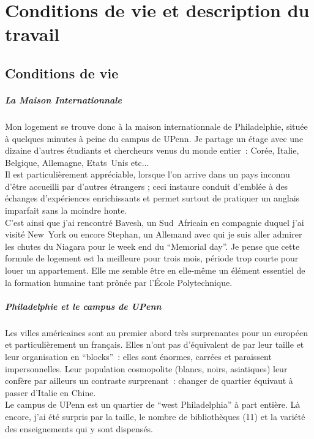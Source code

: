 \documentclass[11pt]{report}
\begin{document}
\chapter{Conditions de vie et description du travail}
\section{Conditions de vie}
\paragraph{La Maison Internationnale\\}
Mon logement se trouve donc \`a la maison internationnale de Philadelphie, 
situ\'ee \`a quelques minutes \`a peine du campus de UPenn. Je partage un 
\'etage avec une dizaine d'autres \'etudiants et chercheurs venus du monde 
entier~: Cor\'ee, Italie, Belgique, Allemagne, Etats~Unis etc...\\
Il est particuli\`erement appr\'eciable, lorsque l'on arrive dans un pays
inconnu d'\^etre accueilli par d'autres \'etrangers ; ceci instaure 
conduit d'embl\'ee \`a des \'echanges d'exp\'eriences enrichissants et 
permet surtout de pratiquer un anglais imparfait sans la moindre honte.\\
C'est ainsi que j'ai rencontr\'e Bavesh, un Sud~Africain en compagnie duquel 
j'ai visit\'e New~York ou encore Stephan, un Allemand avec qui je suis aller
admirer les chutes du Niagara pour le week end du ``Memorial day''. 
Je pense que cette formule de logement est la
meilleure pour trois mois, p\'eriode trop courte pour louer un appartement.
Elle me semble \^etre en elle-m\^eme un \'el\'ement essentiel de la formation
humaine tant pr\^on\'ee par l'\'Ecole Polytechnique. 
\paragraph{Philadelphie et le campus de UPenn\\}
Les villes am\'ericaines sont au premier abord tr\`es surprenantes pour un
europ\'een et particuli\`erement un fran\c{c}ais. Elles n'ont pas 
d'\'equivalent de par leur taille et leur organisation en ``blocks''~:
elles sont \'enormes, carr\'ees et paraissent impersonnelles. Leur population
cosmopolite (blancs, noirs, asiatiques) leur conf\`ere par ailleurs un 
contraste surprenant~: changer de quartier \'equivaut \`a passer d'Italie en
Chine.\\
Le campus de UPenn est un quartier de ``west Philadelphia'' \`a part enti\`ere.
L\`a encore, j'ai \'et\'e surpris par la taille, le nombre de biblioth\`eques 
(11) et la vari\'et\'e des enseignements qui y sont dispens\'es.
\end{document}
